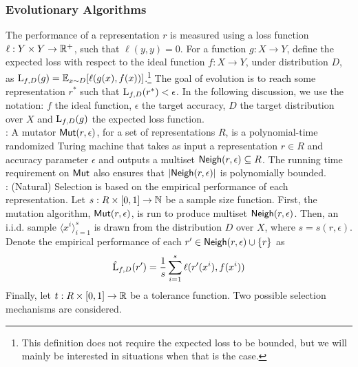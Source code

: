 \subsubsection*{Evolutionary Algorithms}

The performance of a representation $r$ is measured using a loss function $\ell
: Y \times Y \rightarrow \mathbb{R}^+$, such that $\ell(y, y) = 0$. For a function
$g : X \rightarrow Y$, define the expected loss with respect to the ideal
function $f : X \rightarrow Y$, under distribution $D$, as $\mathrm{L}_{f, D}(g) =
\mathbb{E}_{x \sim D}[\ell(g(x), f(x))]$.\footnote{This definition does not require the
expected loss to be bounded, but we will mainly be interested in situations when
that is the case.} The goal of evolution is to reach some representation $r^*$
such that $\mathrm{L}_{f, D}(r^*) < \epsilon$. In the following discussion, we use
the notation: $f$ the ideal function, $\epsilon$ the target accuracy, $D$ the
target distribution over $X$ and $\mathrm{L}_{f, D}(g)$ the expected loss function.  \medskip \\
%
: A mutator $\mathsf{Mut}(r, \epsilon)$, for a set of representations $R$, is
a polynomial-time randomized Turing machine that takes as input a representation
$r \in R$ and accuracy parameter $\epsilon$ and outputs a multiset $\mathsf{Neigh}(r,
\epsilon) \subseteq R$. The running time requirement on $\mathsf{Mut}$ also ensures that
$|\mathsf{Neigh}(r, \epsilon)|$ is polynomially bounded. \medskip \\
%
: (Natural) Selection is based on the empirical performance
of each representation. Let $s : R \times [0, 1] \rightarrow \mathbb{N}$ be a
sample size function. First, the mutation algorithm, $\mathsf{Mut}(r, \epsilon)$, is run
to produce multiset $\mathsf{Neigh}(r, \epsilon)$. Then, an i.i.d. sample $\langle x^i
\rangle_{i=1}^s$ is drawn from the distribution $D$ over $X$, where $s = s(r,
\epsilon)$.  Denote the empirical performance of each $r^\prime \in \mathsf{Neigh}(r,
\epsilon) \cup \{r \}$ as
%
\[ \hat{\mathrm{L}}_{f, D}(r^\prime) = \frac{1}{s}\sum_{i=1}^s \ell(r^\prime(x^i),
f(x^i)) \]
%
Finally, let $t : R \times [0, 1] \rightarrow \mathbb{R}$ be a tolerance function.
Two possible selection mechanisms are considered.
